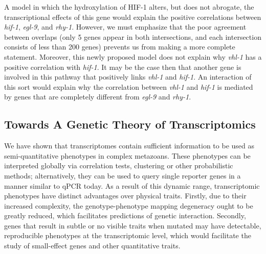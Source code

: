 \documentclass[9pt,twocolumn,twoside]{pnas-new}
\newcommand{\cel}{\emph{C.~elegans}}
\newcommand{\egl}{\emph{egl-9}}
\newcommand{\rhy}{\emph{rhy-1}}
\newcommand{\vhl}{\emph{vhl-1}}
\newcommand{\hif}{\emph{hif-1}}
\newcommand{\hifp}{HIF-1}
\begin{document}
A model in which the hydroxylation of \hifp{} alters, but does not abrogate, the
transcriptional effects of this gene would explain the positive correlations
between \hif{}, \egl{}, and \rhy{}. However, we must emphasize that the poor
agreement between overlaps (only 5 genes appear in both intersections, and each
intersection consists of less than 200 genes) prevents us from making a more
complete statement. Moreover, this newly proposed model does not explain why
\vhl{} has a positive correlation with \hif{}. It may be the case then that
another gene is involved in this pathway that positively links \vhl{} and
\hif{}. An interaction of this sort would explain why the correlation between
\vhl{} and \hif{} is mediated by genes that are completely different from \egl{}
and \rhy{}.



\subsection*{Towards A Genetic Theory of Transcriptomics}
We have shown that transcriptomes contain sufficient information to be used as
semi-quantitative phenotypes in complex metazoans. These phenotypes can be
interpreted globally via correlation tests, clustering or other probabilistic
methods; alternatively, they can be used to query single reporter genes in a
manner similar to qPCR today. As a result of this dynamic range, transcriptomic
phenotypes have distinct advantages over physical traits.
Firstly, due to their increased complexity, the genotype-phenotype mapping
degeneracy ought to be greatly reduced, which facilitates predictions of genetic
interaction. Secondly, genes that result in subtle or no visible traits when
mutated may have detectable, reproducible phenotypes at the transcriptomic level,
which would facilitate the study of small-effect genes and other quantitative
traits.
\end{document}
